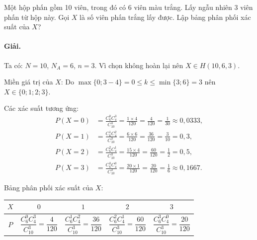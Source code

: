 \begin{vidu}[VD 1]
Một hộp phấn gồm 10 viên, trong đó có 6 viên màu trắng. Lấy ngẫu nhiên 3 viên phấn từ hộp này. Gọi $X$ là số viên phấn trắng lấy được. Lập bảng phân phối xác suất của $X$?

\paragraph{Giải.}
Ta có: $N = 10$, $N_A = 6$, $n = 3$. Vì chọn không hoàn lại nên $X \in H(10, 6, 3)$.

Miền giá trị của $X$: Do $\max\{0; 3 - 4\} = 0 \le k \le \min\{3; 6\} = 3$ nên $X \in \{0; 1; 2; 3\}$.

Các xác suất tương ứng:
\begin{align*}
P(X = 0) &= \frac{C_6^0 C_4^3}{C_{10}^3} = \frac{1 \times 4}{120} = \frac{4}{120} = \frac{1}{30} \approx 0{,}0333, \\
P(X = 1) &= \frac{C_6^1 C_4^2}{C_{10}^3} = \frac{6 \times 6}{120} = \frac{36}{120} = \frac{3}{10} = 0{,}3, \\
P(X = 2) &= \frac{C_6^2 C_4^1}{C_{10}^3} = \frac{15 \times 4}{120} = \frac{60}{120} = \frac{1}{2} = 0{,}5, \\
P(X = 3) &= \frac{C_6^3 C_4^0}{C_{10}^3} = \frac{20 \times 1}{120} = \frac{20}{120} = \frac{1}{6} \approx 0{,}1667.
\end{align*}

Bảng phân phối xác suất của $X$:
\begin{center}
\renewcommand{\arraystretch}{1.5}
\begin{tabular}{|c|c|c|c|c|}
\hline
$X$ & $0$ & $1$ & $2$ & $3$ \\
\hline
$P$ & $\dfrac{C_6^0 C_4^3}{C_{10}^3} = \dfrac{4}{120}$ & $\dfrac{C_6^1 C_4^2}{C_{10}^3} = \dfrac{36}{120}$ & $\dfrac{C_6^2 C_4^1}{C_{10}^3} = \dfrac{60}{120}$ & $\dfrac{C_6^3 C_4^0}{C_{10}^3} = \dfrac{20}{120}$ \\
\hline
\end{tabular}
\end{center}
\end{vidu}

